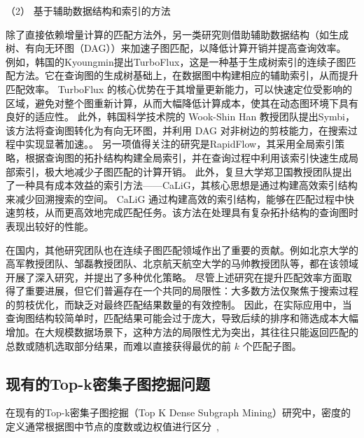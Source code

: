 （2） 基于辅助数据结构和索引的方法

除了直接依赖增量计算的匹配方法外，另一类研究则借助辅助数据结构（如生成树、有向无环图（DAG））来加速子图匹配，以降低计算开销并提高查询效率。
例如，韩国的Kyoungmin提出TurboFlux\cite{csm-turboflux-DBLP:conf/sigmod/KimSHLHCSJ18}，这是一种基于生成树索引的连续子图匹配方法。它在查询图的生成树基础上，在数据图中构建相应的辅助索引，从而提升匹配效率。
TurboFlux 的核心优势在于其增量更新能力，可以快速定位受影响的区域，避免对整个图重新计算，从而大幅降低计算成本，使其在动态图环境下具有良好的适应性。
此外，韩国科学技术院的 Wook-Shin Han 教授团队提出Symbi\cite{csm-symbi-DBLP:journals/pvldb/MinPPGIH21}，该方法将查询图转化为有向无环图，并利用 DAG 对非树边的剪枝能力，在搜索过程中实现显著加速。。
另一项值得关注的研究是RapidFlow\cite{csm-rapidflow-DBLP:journals/pvldb/SunSHL22}，其采用全局索引策略，根据查询图的拓扑结构构建全局索引，并在查询过程中利用该索引快速生成局部索引，极大地减少子图匹配的计算开销。
此外，复旦大学郑卫国教授团队提出了一种具有成本效益的索引方法——CaLiG\cite{csm-calig-DBLP:journals/pacmmod/YangZZY23}，其核心思想是通过构建高效索引结构来减少回溯搜索的空间。
CaLiG 通过构建高效的索引结构，能够在匹配过程中快速剪枝，从而更高效地完成匹配任务。该方法在处理具有复杂拓扑结构的查询图时表现出较好的性能。

在国内，其他研究团队也在连续子图匹配领域作出了重要的贡献。例如北京大学的高军教授团队、邹磊教授团队、北京航天航空大学的马帅教授团队等，都在该领域开展了深入研究，并提出了多种优化策略。
尽管上述研究在提升匹配效率方面取得了重要进展，但它们普遍存在一个共同的局限性：大多数方法仅聚焦于搜索过程的剪枝优化，而缺乏对最终匹配结果数量的有效控制。
因此，在实际应用中，当查询图结构较简单时，匹配结果可能会过于庞大，导致后续的排序和筛选成本大幅增加。在大规模数据场景下，这种方法的局限性尤为突出，其往往只能返回匹配的总数或随机选取部分结果，而难以直接获得最优的前 $k$ 个匹配子图。
\subsection{现有的Top-k密集子图挖掘问题}
在现有的Top-k密集子图挖掘（Top K Dense Subgraph Mining）研究中，密度的定义通常根据图中节点的度数或边权值进行区分~\cite{dsm-noweight-Bahmani-DBLP:journals/pvldb/BahmaniKV12,dsm-noweight-Balalau-DBLP:conf/wsdm/BalalauBCGS15,dsm-noweight-Bonchi-DBLP:journals/corr/abs-2007-01533,dsm-noweight-Dondi-DBLP:journals/corr/abs-2002-07695,dsm-noweight-Fang-DBLP:journals/pvldb/FangYCLL19,dsm-noweight-Gabert-DBLP:conf/wsdm/GabertPC21,dsm-noweight-Hu-DBLP:conf/cikm/HuWC17,dsm-noweight-Ma-DBLP:journals/pvldb/MaCLH22,dsm-noweight-Mathieu-DBLP:journals/corr/abs-2010-07794,dsm-noweight-McGregor-DBLP:journals/corr/McGregorTVV15,dsm-noweight-Rozenshtein-DBLP:journals/tkdd/RozenshteinTG17,dsm-noweight-Saha-DBLP:journals/corr/abs-2212-08820,dsm-noweight-Tsourakakis-DBLP:conf/kdd/TsourakakisBGGT13,dsm-noweight-Valari-DBLP:conf/ssdbm/ValariKP12,dsm-noweight-Zhao-DBLP:conf/icalip/ZhaoQYB14,dsm-weight-Angel-DBLP:journals/vldb/AngelKSSST14,dsm-weight-Ma-DBLP:conf/icde/MaHWLH17,dsm-weight-Muhammad-DBLP:conf/cikm/NasirGMG17},

